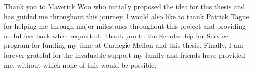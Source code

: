 \acknowledgements

\setcounter{page}{2}

Thank you to Maverick Woo who initially proposed the idea for this thesis and has guided me throughout this journey. I would also like to thank Patrick Tague for helping me through major milestones throughout this project and providing useful feedback when requested. Thank you to the Scholarship for Service program for funding my time at Carnegie Mellon and this thesis. Finally, I am forever grateful for the invaluable support my family and friends have provided me, without which none of this would be possible.